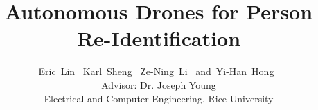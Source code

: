 \documentclass[conference]{IEEEtran}
\begin{document}
\title{Autonomous Drones for Person Re-Identification}

\author{Eric~Lin~
        Karl~Sheng~
        Ze-Ning~Li~
        and~Yi-Han~Hong~\\ 
        Advisor: Dr. Joseph Young\\
        Electrical and Computer Engineering, Rice University
        }%
\maketitle











% 
\end{document}

